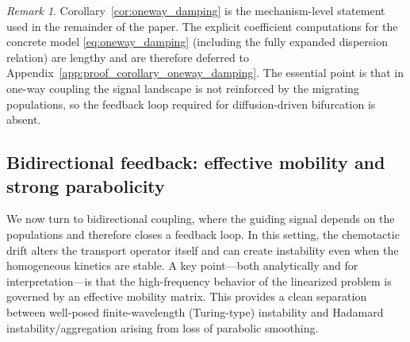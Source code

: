 \documentclass[pdflatex,sn-mathphys-ay]{sn-jnl}
\theoremstyle{thmstyleone}
\theoremstyle{definition}
\theoremstyle{remark}
\newtheorem{remark}[theorem]{Remark}
\begin{document}
\begin{remark}
Corollary~\ref{cor:oneway_damping} is the mechanism-level statement used in the remainder of the paper. 
The explicit coefficient computations for the concrete model \eqref{eq:oneway_damping} (including the fully expanded dispersion relation) are lengthy and are therefore deferred to Appendix~\ref{app:proof_corollary_oneway_damping}. 
The essential point is that in one-way coupling the signal landscape is not reinforced by the migrating populations, so the feedback loop required for diffusion-driven bifurcation is absent.
\end{remark}

\subsection{Bidirectional feedback: effective mobility and strong parabolicity}
\label{subsec:twoway_parabolicity}

We now turn to bidirectional coupling, where the guiding signal depends on the populations and therefore closes a feedback loop. 
In this setting, the chemotactic drift alters the transport operator itself and can create instability even when the homogeneous kinetics are stable. 
A key point---both analytically and for interpretation---is that the high-frequency behavior of the linearized problem is governed by an effective mobility matrix. 
This provides a clean separation between well-posed finite-wavelength (Turing-type) instability and Hadamard instability/aggregation arising from loss of parabolic smoothing.
\end{document}
